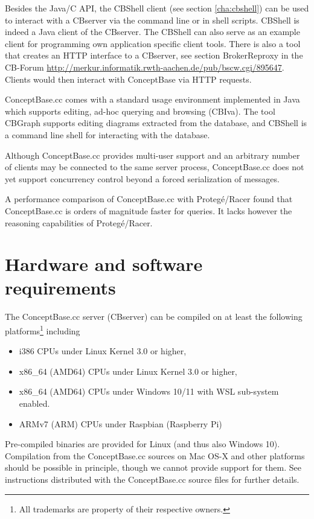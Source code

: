 Besides the Java/C API,
the CBShell client (see section \ref{cha:cbshell}) can be used to interact with a CBserver
via the command line or in shell scripts. CBShell is indeed a Java client of the CBserver.
The CBShell can also serve as an example client for programming own application
specific client tools.
There is also a tool that creates an
HTTP interface to a CBserver, see section BrokerReproxy in the CB-Forum 
\url{http://merkur.informatik.rwth-aachen.de/pub/bscw.cgi/895647}. Clients would then
interact with ConceptBase via HTTP requests.




ConceptBase.cc comes with a standard usage environment
implemented in Java which supports editing, ad-hoc querying
and browsing (CBIva). The tool CBGraph supports editing diagrams extracted from
the database, and CBShell is a command line shell for interacting with the database.

Although ConceptBase.cc provides multi-user support and
an arbitrary number of clients may be connected to the same server process,
ConceptBase.cc does not yet support concurrency control beyond a forced
serialization of messages.

A performance comparison \cite{Lud2010} of ConceptBase.cc with Proteg{\'e}/Racer found that 
ConceptBase.cc is orders of magnitude faster for queries. It lacks however the
reasoning capabilities of Proteg{\'e}/Racer.



\section{Hardware and software requirements}
\label{sec:requirements}

The ConceptBase.cc server (CBserver) can be compiled on at
least the following platforms\footnote{All trademarks are property of their respective
owners.} including
\begin{itemize}
\item i386 CPUs under Linux Kernel 3.0 or higher,
\item x86\_64 (AMD64) CPUs under Linux Kernel 3.0 or higher,
\item x86\_64 (AMD64) CPUs under Windows 10/11 with WSL sub-system enabled.
\item ARMv7 (ARM) CPUs under Raspbian (Raspberry Pi)
\end{itemize}
Pre-compiled binaries are provided for Linux (and thus also Windows 10).
Compilation from the ConceptBase.cc sources on Mac OS-X and other platforms should
be possible in principle, though we cannot provide support for them.
See instructions distributed with the ConceptBase.cc source files for further details.

